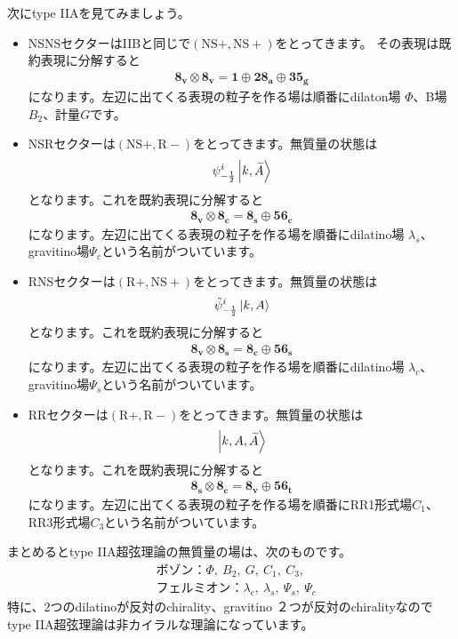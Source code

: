 \documentclass[report,paper=a4, fontsize=12pt, line_length=16cm, number_of_lines=34,dvipdfmx]{jlreq}
\numberwithin{equation}{chapter}
\numberwithin{equation}{section}
\newcommand{\At}{\widetilde{A}}
\newcommand{\psit}{\tilde{\psi}}
\newcommand{\NSp}{\mathrm{NS}+}
\newcommand{\Rp}{\mathrm{R}+}
\newcommand{\Rm}{\mathrm{R}-}
\newcommand{\triv}{\mathbf{1}}
\newcommand{\etv}{\mathbf{8_v}}
\newcommand{\ets}{\mathbf{8_s}}
\newcommand{\etc}{\mathbf{8_c}}
\newcommand{\tweta}{\mathbf{28_{a}}}
\newcommand{\thfvg}{\mathbf{35_{g}}}
\newcommand{\fsxt}{\mathbf{56_t}}
\newcommand{\fsxs}{\mathbf{56_s}}
\newcommand{\fsxc}{\mathbf{56_c}}
\begin{document}
次にtype IIAを見てみましょう。
\begin{itemize}
  \item NSNSセクターはIIBと同じで$(\NSp,\NSp)$をとってきます。
  その表現は既約表現に分解すると
  \begin{align}
    \etv\otimes\etv= \triv \oplus \tweta\oplus \thfvg
  \end{align}
  になります。左辺に出てくる表現の粒子を作る場は順番にdilaton場 $\Phi$、B場$B_2$、計量$G$です。
  \item NSRセクターは$(\NSp,\Rm)$をとってきます。無質量の状態は
  \begin{align}
    \psi_{-\frac12}^{i}\ket{k,\At}
  \end{align}
  となります。これを既約表現に分解すると
  \begin{align}
    \etv\otimes\etc= \ets \oplus \fsxc
  \end{align}
  になります。左辺に出てくる表現の粒子を作る場を順番にdilatino場 $\lambda_{s}$、gravitino場$\Psi_{c}$という名前がついています。
  \item RNSセクターは$(\Rp,\NSp)$をとってきます。無質量の状態は
  \begin{align}
    \psit_{-\frac12}^{i}\ket{k,A}
  \end{align}
  となります。これを既約表現に分解すると
  \begin{align}
    \etv\otimes\ets= \etc \oplus \fsxs
  \end{align}
  になります。左辺に出てくる表現の粒子を作る場を順番にdilatino場 $\lambda_{c}$、gravitino場$\Psi_{s}$という名前がついています。
  \item RRセクターは$(\Rp,\Rm)$をとってきます。無質量の状態は
  \begin{align}
    \ket{k,A,\At}
  \end{align}
  となります。これを既約表現に分解すると
  \begin{align}
    \ets\otimes\etc= \etv\oplus\fsxt
  \end{align}
  になります。左辺に出てくる表現の粒子を作る場を順番にRR1形式場$C_1$、RR3形式場$C_3$という名前がついています。
\end{itemize}
まとめるとtype IIA超弦理論の無質量の場は、次のものです。
\begin{align}
  &\text{ボゾン：}\Phi,\ B_2,\ G,\ C_1,\ C_3,\\
  &\text{フェルミオン：} \lambda_{c},\ \lambda_{s},\ \Psi_{s},\ \Psi_{c}
\end{align}
特に、2つのdilatinoが反対のchirality、gravitino ２つが反対のchiralityなのでtype IIA超弦理論は非カイラルな理論になっています。
\end{document}
